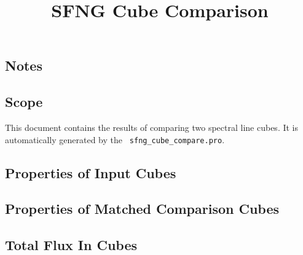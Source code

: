 \documentclass[11pt]{report}
\begin{document}
\title{SFNG Cube Comparison}

\maketitle

\newpage
\tableofcontents

\chapter{}
\section{Notes}
\label{sect:notes}


\section{Scope}
\label{sec:scope}

This document contains the results of comparing two spectral line
cubes. It is automatically generated by the {\tt
  sfng\_cube\_compare.pro}.

\section{Properties of Input Cubes}
\label{sect:input_cubes}


\section{Properties of Matched Comparison Cubes}
\label{sect:match_cubes}


\section{Total Flux In Cubes}
\label{sect:totflux}

\end{document}
